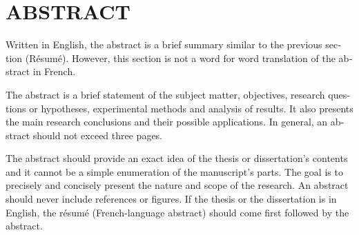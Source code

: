 
\chapter*{ABSTRACT}\thispagestyle{headings}
%
\begin{otherlanguage}{english}

Written in English, the abstract is a brief summary similar to the previous
section {(Résumé)}. However, this section is not a
word for word translation of the abstract in French.

The abstract is a brief statement of the subject matter, objectives, research questions or hypotheses, experimental methods and analysis of results. It also presents the main research conclusions and their possible applications. In general, an abstract should not exceed three pages.

The abstract should provide an exact idea of the thesis or dissertation’s contents and it cannot be a simple enumeration of the manuscript’s parts. The goal is to precisely and concisely present the nature and scope of the research. An abstract should never include references or figures. If the thesis or the dissertation is in English, the résumé (French-language abstract) should come first followed by the abstract.

\end{otherlanguage}

